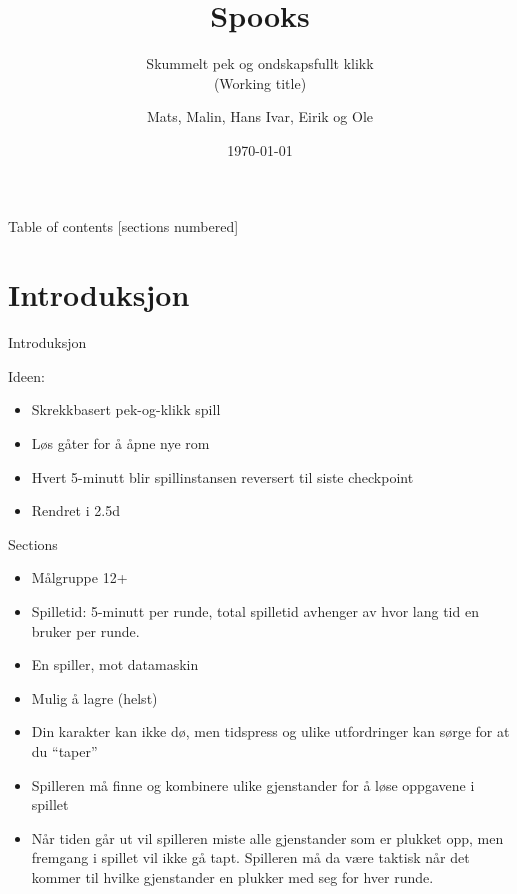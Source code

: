 \documentclass[10pt]{beamer}
\title{Spooks}
\subtitle{Skummelt pek og ondskapsfullt klikk \\ (Working title)}
\date{\today}
\author{Mats, Malin, Hans Ivar, Eirik og Ole}
\institute{}
\begin{document}
	
	\maketitle
	
	\begin{frame}{Table of contents}
		[sections numbered]
		\tableofcontents[hideallsubsections]
	\end{frame}
	
	\section{Introduksjon}
	
	\begin{frame}[fragile]{Introduksjon}
		
	  Ideen:

          \begin{itemize}
          \item Skrekkbasert pek-og-klikk spill
          \item Løs gåter for å åpne nye rom
          \item Hvert 5-minutt blir spillinstansen reversert til siste checkpoint
          \item Rendret i 2.5d
          \end{itemize}

          
	\end{frame}
	
	\begin{frame}[fragile]{Sections}
		\begin{itemize}
			\item Målgruppe 12+
			\item {Spilletid: 5-minutt per runde, total spilletid avhenger av hvor lang tid en bruker per runde.}
			\item {En spiller, mot datamaskin}
			\item {Mulig å lagre (helst)}
			\item {Din karakter kan ikke dø, men tidspress og ulike utfordringer kan sørge for at du ``taper''}
			\item {Spilleren må finne og kombinere ulike gjenstander for å løse oppgavene i spillet}
			\item {Når tiden går ut vil spilleren miste alle gjenstander som er plukket opp, men fremgang i spillet vil ikke gå tapt. Spilleren må da være taktisk når det kommer til hvilke gjenstander en plukker med seg for hver runde.}
		\end{itemize}
	\end{frame}
	
\end{document}
